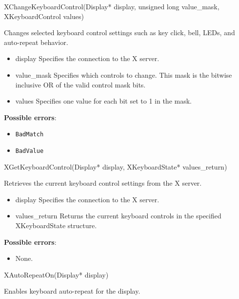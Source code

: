 \documentclass{report}
\begin{document}
\begin{itemize}
        \begin{cppcode}
        XChangeKeyboardControl(Display* display, unsigned long value_mask, XKeyboardControl values)
        \end{cppcode}
        \bigbreak \noindent
        Changes selected keyboard control settings such as key click, bell, LEDs, and auto-repeat behavior.

        \begin{itemize}
            \item display Specifies the connection to the X server.
            \item value\_mask Specifies which controls to change. This mask is the bitwise inclusive OR of the valid control mask bits.
            \item values Specifies one value for each bit set to 1 in the mask.
        \end{itemize}

        \textbf{Possible errors}:
        \begin{itemize}
            \item \texttt{BadMatch}
            \item \texttt{BadValue}
        \end{itemize}

        \begin{cppcode}
        XGetKeyboardControl(Display* display, XKeyboardState* values_return)
        \end{cppcode}
        \bigbreak \noindent
        Retrieves the current keyboard control settings from the X server.

        \begin{itemize}
            \item display Specifies the connection to the X server.
            \item values\_return Returns the current keyboard controls in the specified XKeyboardState structure.
        \end{itemize}

        \textbf{Possible errors}:
        \begin{itemize}
            \item None.
        \end{itemize}

        \begin{cppcode}
            XAutoRepeatOn(Display* display)
        \end{cppcode}
        \bigbreak \noindent
        Enables keyboard auto-repeat for the display.


\end{itemize}
\end{document}
